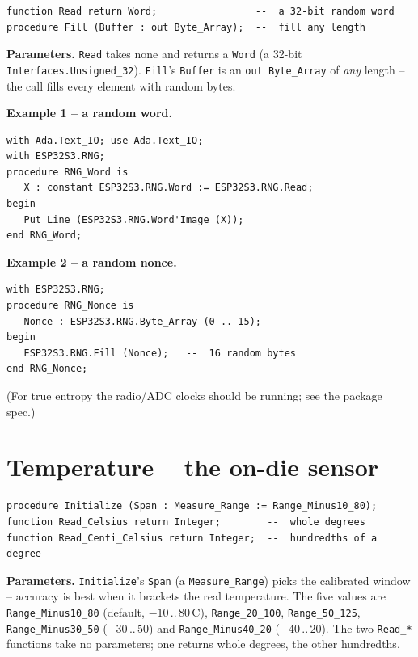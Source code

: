\begin{lstlisting}
function Read return Word;                 --  a 32-bit random word
procedure Fill (Buffer : out Byte_Array);  --  fill any length
\end{lstlisting}

\textbf{Parameters.} \texttt{Read} takes none and returns a \texttt{Word} (a 32-bit
\texttt{Interfaces.Unsigned\_32}). \texttt{Fill}'s \texttt{Buffer} is an
\texttt{out Byte\_Array} of \emph{any} length -- the call fills every element with
random bytes.

\textbf{Example 1 -- a random word.}
\begin{lstlisting}
with Ada.Text_IO; use Ada.Text_IO;
with ESP32S3.RNG;
procedure RNG_Word is
   X : constant ESP32S3.RNG.Word := ESP32S3.RNG.Read;
begin
   Put_Line (ESP32S3.RNG.Word'Image (X));
end RNG_Word;
\end{lstlisting}

\textbf{Example 2 -- a random nonce.}
\begin{lstlisting}
with ESP32S3.RNG;
procedure RNG_Nonce is
   Nonce : ESP32S3.RNG.Byte_Array (0 .. 15);
begin
   ESP32S3.RNG.Fill (Nonce);   --  16 random bytes
end RNG_Nonce;
\end{lstlisting}

(For true entropy the radio/ADC clocks should be running; see the package spec.)

\section{Temperature -- the on-die sensor}

\begin{lstlisting}
procedure Initialize (Span : Measure_Range := Range_Minus10_80);
function Read_Celsius return Integer;        --  whole degrees
function Read_Centi_Celsius return Integer;  --  hundredths of a degree
\end{lstlisting}

\textbf{Parameters.} \texttt{Initialize}'s \texttt{Span} (a \texttt{Measure\_Range})
picks the calibrated window -- accuracy is best when it brackets the real
temperature. The five values are \texttt{Range\_Minus10\_80} (default, $-10\,..\,80$\,\textdegree C),
\texttt{Range\_20\_100}, \texttt{Range\_50\_125}, \texttt{Range\_Minus30\_50}
($-30\,..\,50$) and \texttt{Range\_Minus40\_20} ($-40\,..\,20$). The two
\texttt{Read\_*} functions take no parameters; one returns whole degrees, the
other hundredths.

